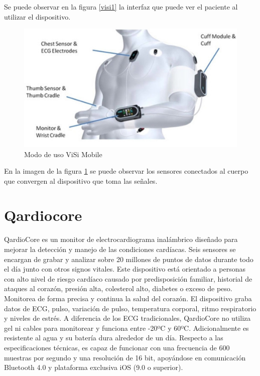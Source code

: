Se puede observar en la figura \ref{visi1} la interfaz que puede ver el paciente al utilizar el dispositivo.

\begin{figure}[H]
	\centering
	\includegraphics[scale=0.7]{figuras/estadoarte/visi/wear.jpg}
	\caption{Modo de uso ViSi Mobile\textregistered}
	\label{visi2}
\end{figure}

En la imagen de la figura \ref{visi2} se puede observar los sensores conectados al cuerpo que convergen al dispositivo que toma las señales.

\section{Qardiocore\textregistered}

QardioCore\cite{qardio} es un monitor de electrocardiograma inalámbrico diseñado para mejorar la detección y manejo de las condiciones cardíacas. Seis sensores se encargan de grabar y analizar sobre 20 millones de puntos de datos durante todo el día junto con otros signos vitales. Este dispositivo está orientado a personas con alto nivel de riesgo cardíaco causado por predisposición familiar, historial de ataques al corazón, presión alta, colesterol alto, diabetes o exceso de peso. Monitorea de forma precisa y continua la salud del corazón. El dispositivo graba datos de ECG, pulso, variación de pulso, temperatura corporal, ritmo respiratorio y niveles de estrés. A diferencia de los ECG tradicionales, QardioCore no utiliza gel ni cables para monitorear y funciona entre -20ºC y 60ºC. Adicionalmente es resistente al agua y su batería dura alrededor de un día. Respecto a las especificaciones técnicas, es capaz de funcionar con una frecuencia de 600 muestras por segundo y una resolución de 16 bit, apoyándose en comunicación Bluetooth 4.0 y plataforma exclusiva iOS (9.0 o superior)\cite{qardio_tel}.

